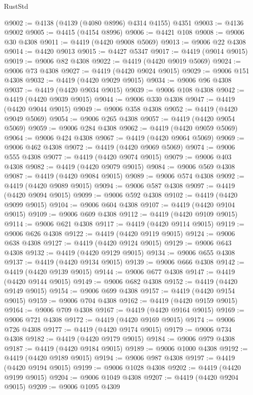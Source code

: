 \begin{lexlean}{RustStd}
\begin{coremodule}
@9002 := @4138 (@4139 (@4080 @8996) @4314 @4155) @4351
@9003 := @4136 @9002
@9005 := @4415 (@4154 @8996)
@9006 := @4421 @108
@9008 := @9006 @30 @4308
@9011 := @4419 (@4420 @9008 @5069)
@9013 := @9006 @22 @4308
@9014 := @4420 @9013
@9015 := @4427 @5347
@9017 := @4419 (@9014 @9015)
@9019 := @9006 @82 @4308
@9022 := @4419 (@4420 @9019 @5069)
@9024 := @9006 @73 @4308
@9027 := @4419 (@4420 @9024 @9015)
@9029 := @9006 @151 @4308
@9032 := @4419 (@4420 @9029 @9015)
@9034 := @9006 @96 @4308
@9037 := @4419 (@4420 @9034 @9015)
@9039 := @9006 @108 @4308
@9042 := @4419 (@4420 @9039 @9015)
@9044 := @9006 @330 @4308
@9047 := @4419 (@4420 @9044 @9015)
@9049 := @9006 @358 @4308
@9052 := @4419 (@4420 @9049 @5069)
@9054 := @9006 @265 @4308
@9057 := @4419 (@4420 @9054 @5069)
@9059 := @9006 @284 @4308
@9062 := @4419 (@4420 @9059 @5069)
@9064 := @9006 @424 @4308
@9067 := @4419 (@4420 @9064 @5069)
@9069 := @9006 @462 @4308
@9072 := @4419 (@4420 @9069 @5069)
@9074 := @9006 @555 @4308
@9077 := @4419 (@4420 @9074 @9015)
@9079 := @9006 @403 @4308
@9082 := @4419 (@4420 @9079 @9015)
@9084 := @9006 @569 @4308
@9087 := @4419 (@4420 @9084 @9015)
@9089 := @9006 @574 @4308
@9092 := @4419 (@4420 @9089 @9015)
@9094 := @9006 @587 @4308
@9097 := @4419 (@4420 @9094 @9015)
@9099 := @9006 @592 @4308
@9102 := @4419 (@4420 @9099 @9015)
@9104 := @9006 @604 @4308
@9107 := @4419 (@4420 @9104 @9015)
@9109 := @9006 @609 @4308
@9112 := @4419 (@4420 @9109 @9015)
@9114 := @9006 @621 @4308
@9117 := @4419 (@4420 @9114 @9015)
@9119 := @9006 @626 @4308
@9122 := @4419 (@4420 @9119 @9015)
@9124 := @9006 @638 @4308
@9127 := @4419 (@4420 @9124 @9015)
@9129 := @9006 @643 @4308
@9132 := @4419 (@4420 @9129 @9015)
@9134 := @9006 @655 @4308
@9137 := @4419 (@4420 @9134 @9015)
@9139 := @9006 @666 @4308
@9142 := @4419 (@4420 @9139 @9015)
@9144 := @9006 @677 @4308
@9147 := @4419 (@4420 @9144 @9015)
@9149 := @9006 @682 @4308
@9152 := @4419 (@4420 @9149 @9015)
@9154 := @9006 @699 @4308
@9157 := @4419 (@4420 @9154 @9015)
@9159 := @9006 @704 @4308
@9162 := @4419 (@4420 @9159 @9015)
@9164 := @9006 @709 @4308
@9167 := @4419 (@4420 @9164 @9015)
@9169 := @9006 @721 @4308
@9172 := @4419 (@4420 @9169 @9015)
@9174 := @9006 @726 @4308
@9177 := @4419 (@4420 @9174 @9015)
@9179 := @9006 @734 @4308
@9182 := @4419 (@4420 @9179 @9015)
@9184 := @9006 @979 @4308
@9187 := @4419 (@4420 @9184 @9015)
@9189 := @9006 @1000 @4308
@9192 := @4419 (@4420 @9189 @9015)
@9194 := @9006 @987 @4308
@9197 := @4419 (@4420 @9194 @9015)
@9199 := @9006 @1028 @4308
@9202 := @4419 (@4420 @9199 @9015)
@9204 := @9006 @1049 @4308
@9207 := @4419 (@4420 @9204 @9015)
@9209 := @9006 @1095 @4309

\end{coremodule}
\end{lexlean}
